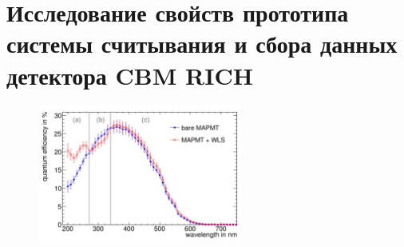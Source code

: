 \chapter{Исследование свойств прототипа системы считывания и сбора данных детектора CBM RICH}\label{sec:secAnalysisResults}


\begin{figure}[H]
\centering
\includegraphics[width=0.6\textwidth]{pictures/QEcurvesKopfer.png}
\caption{}
\label{fig:QEcurvesKopfer}
\end{figure}



% 






